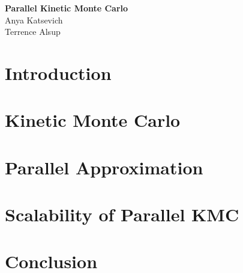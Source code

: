\documentclass[12pt]{article}
\begin{document}
\begin{center}
\Large {\bf Parallel Kinetic Monte Carlo}\\
\vspace{0.2cm}
\large{Anya Katsevich}\\
\large{Terrence Alsup}
\end{center}



\section{Introduction}

\section{Kinetic Monte Carlo}


\section{Parallel Approximation}

\section{Scalability of Parallel KMC}

\section{Conclusion}


\end{document}
